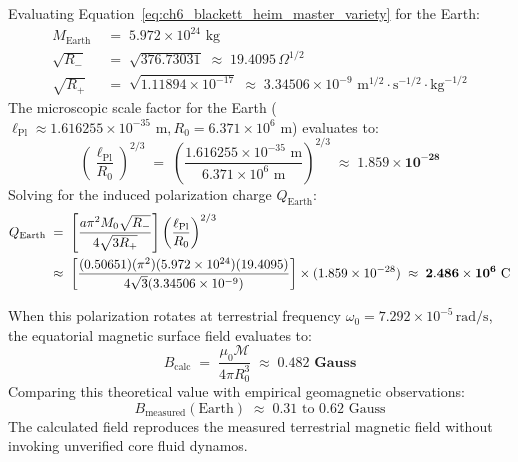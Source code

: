 \documentclass[
    12pt,
    a4paper,
    headings=normal,
    twoside=false,
    open=any,
    parskip=half
]{scrbook}
\begin{document}
Evaluating Equation~\eqref{eq:ch6_blackett_heim_master_variety} for the Earth:
\begin{align*}
M_{\text{Earth}} &\;=\; 5.972 \times 10^{24} \text{ kg} \\
\sqrt{R_-} &\;=\; \sqrt{376.73031} \;\approx\; 19.4095 \, \Omega^{1/2} \\
\sqrt{R_+} &\;=\; \sqrt{1.11894 \times 10^{-17}} \;\approx\; 3.34506 \times 10^{-9} \text{ m}^{1/2}\cdot\text{s}^{-1/2}\cdot\text{kg}^{-1/2}
\end{align*}
The microscopic scale factor for the Earth ($\ell_{\text{Pl}} \approx 1.616255 \times 10^{-35}\text{ m}, R_0 = 6.371 \times 10^6\text{ m}$) evaluates to:
\begin{equation}
\left( \frac{\ell_{\text{Pl}}}{R_0} \right)^{2/3} \;=\; \left( \frac{1.616255 \times 10^{-35} \text{ m}}{6.371 \times 10^6 \text{ m}} \right)^{2/3} \;\approx\; \mathbf{1.859 \times 10^{-28}}
\end{equation}
Solving for the induced polarization charge $Q_{\text{Earth}}$:
\begin{align}
Q_{\text{Earth}} &\;=\; \left[ \frac{a \pi^2 M_0 \sqrt{R_-}}{4\sqrt{3 R_+}} \right] \left(\frac{\ell_{\text{Pl}}}{R_0}\right)^{2/3} \notag \\
&\;\approx\; \left[ \frac{(0.50651)(\pi^2)(5.972 \times 10^{24})(19.4095)}{4\sqrt{3}(3.34506 \times 10^{-9})} \right] \times (1.859 \times 10^{-28}) \;\approx\; \mathbf{2.486 \times 10^{6} \text{ C}}
\label{eq:ch6_induced_charge_evaluated}
\end{align}

When this polarization rotates at terrestrial frequency $\omega_0 = 7.292 \times 10^{-5}\,\text{rad/s}$, the equatorial magnetic surface field evaluates to:
\begin{equation}
B_{\text{calc}} \;=\; \frac{\mu_0 \mathcal{M}}{4\pi R_0^3} \;\approx\; \mathbf{0.482 \text{ Gauss}}
\label{eq:ch6_geomagnetic_field_calculated}
\end{equation}
Comparing this theoretical value with empirical geomagnetic observations:
\begin{equation}
B_{\text{measured}}(\text{Earth}) \;\approx\; 0.31 \text{ to } 0.62 \text{ Gauss}
\end{equation}
The calculated field reproduces the measured terrestrial magnetic field without invoking unverified core fluid dynamos.
\end{document}
